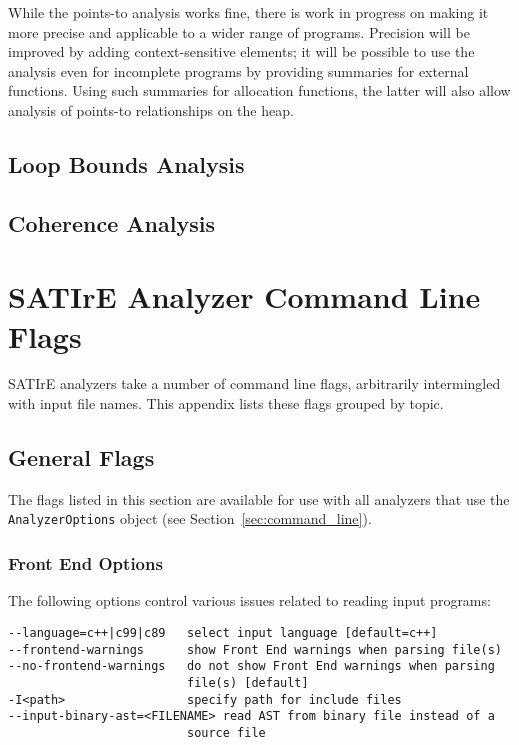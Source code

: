 \documentclass[a4paper,12pt]{report}
\begin{document}
While the points-to analysis works fine, there is work in progress on making
it more precise and applicable to a wider range of programs. Precision will
be improved by adding context-sensitive elements; it will be possible to use
the analysis even for incomplete programs by providing summaries for
external functions. Using such summaries for allocation functions, the
latter will also allow analysis of points-to relationships on the heap.

\section{Loop Bounds Analysis}
\label{sec:analysis_loopbounds}

\section{Coherence Analysis}
\label{sec:analysis_coherence}

\chapter{SATIrE Analyzer Command Line Flags}
\label{appendix:command_line}

SATIrE analyzers take a number of command line flags, arbitrarily
intermingled with input file names. This appendix lists these flags grouped
by topic.

\section{General Flags}
\label{sec:general_flags}

The flags listed in this section are available for use with all analyzers
that use the \texttt{AnalyzerOptions} object (see
Section~\ref{sec:command_line}).

\subsection{Front End Options}

The following options control various issues related to reading input
programs:
{\footnotesize
\begin{verbatim}
--language=c++|c99|c89   select input language [default=c++]
--frontend-warnings      show Front End warnings when parsing file(s)
--no-frontend-warnings   do not show Front End warnings when parsing
                         file(s) [default]
-I<path>                 specify path for include files
--input-binary-ast=<FILENAME> read AST from binary file instead of a
                         source file
\end{verbatim}
}
\end{document}

